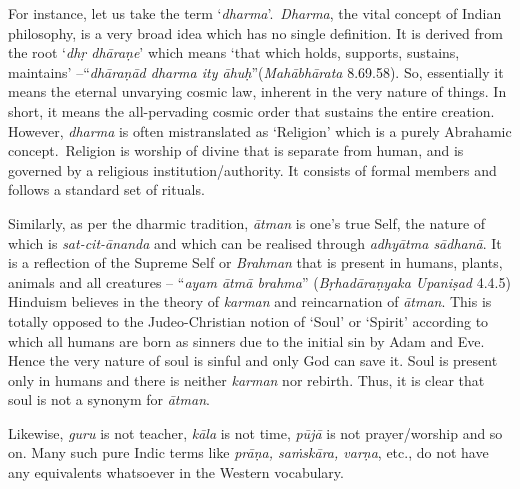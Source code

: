 For instance, let us take the term ‘\textit{dharma}’.~\textit{Dharma}, the vital concept of Indian philosophy, is a very broad idea which has no single definition. It is derived from the root ‘\textit{dhṛ dhāraṇe}’ which means ‘that which holds, supports, sustains, maintains’ –“\textit{dhāraṇād dharma ity āhuḥ}”(\textit{Mahābhārata} 8.69.58). So, essentially it means the eternal unvarying cosmic law, inherent in the very nature of things. In short, it means the all-pervading cosmic order that sustains the entire creation. However, \textit{dharma} is often mistranslated as ‘Religion’ which is a purely Abrahamic concept.~Religion is worship of divine that is separate from human, and is governed by a religious institution/authority. It consists of formal members and follows a standard set of rituals. 

Similarly, as per the dharmic tradition, \textit{ātman} is one’s true Self, the nature of which is \textit{sat-cit-ānanda} and which can be realised through \textit{adhyātma sādhanā}. It is a reflection of the Supreme Self or \textit{Brahman} that is present in humans, plants, animals and all creatures – “\textit{ayam ātmā brahma}” (\textit{Bṛhadāraṇyaka Upaniṣad} 4.4.5) Hinduism believes in the theory of \textit{karman} and reincarnation of \textit{ātman}. This is totally opposed to the Judeo-Christian notion of ‘Soul’ or ‘Spirit’ according to which all humans are born as sinners due to the initial sin by Adam and Eve. Hence the very nature of soul is sinful and only God can save it. Soul is present only in humans and there is neither \textit{karman} nor rebirth. Thus, it is clear that soul is not a synonym for \textit{ātman}.

Likewise, \textit{guru} is not teacher, \textit{kāla} is not time, \textit{pūjā} is not prayer/worship and so on. Many such pure Indic terms like \textit{prāṇa, saṁskāra, varṇa}, etc., do not have any equivalents whatsoever in the Western vocabulary.

